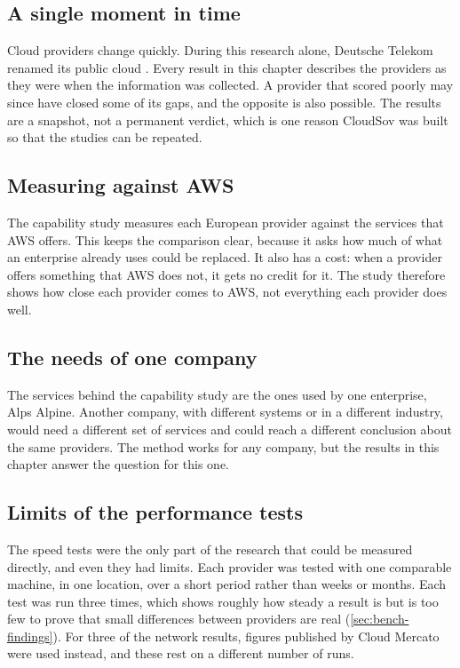 \subsection*{A single moment in time}

Cloud providers change quickly. During this research alone, Deutsche Telekom renamed
its public cloud \cite{TCloudPublic_2026}. Every result in this chapter describes the
providers as they were when the information was collected. A provider that scored
poorly may since have closed some of its gaps, and the opposite is also possible.
The results are a snapshot, not a permanent verdict, which is one reason CloudSov
was built so that the studies can be repeated.

\subsection*{Measuring against \acs{AWS}}

The capability study measures each European provider against the services that
\acs{AWS} offers. This keeps the comparison clear, because it asks how much of what
an enterprise already uses could be replaced. It also has a cost: when a provider
offers something that \acs{AWS} does not, it gets no credit for it. The study
therefore shows how close each provider comes to \acs{AWS}, not everything each
provider does well.

\subsection*{The needs of one company}

The services behind the capability study are the ones used by one enterprise, Alps
Alpine. Another company, with different systems or in a different industry, would
need a different set of services and could reach a different conclusion about the
same providers. The method works for any company, but the results in this chapter
answer the question for this one.

\subsection*{Limits of the performance tests}

The speed tests were the only part of the research that could be measured directly,
and even they had limits. Each provider was tested with one comparable machine, in
one location, over a short period rather than weeks or months. Each test was run
three times, which shows roughly how steady a result is but is too few to prove
that small differences between providers are real (\cref{sec:bench-findings}). For
three of the network results, figures published by Cloud Mercato were used instead,
and these rest on a different number of runs.

